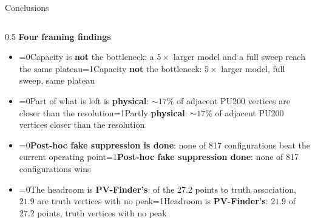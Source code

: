 \documentclass[xcolor=table,aspectratio=169]{beamer}
\providecommand{\talkbuild}{0}
\newcommand{\readingonly}[1]{\ifnum\talkbuild=0\relax#1\fi}
\newcommand{\talkonly}[1]{\ifnum\talkbuild=1\relax#1\fi}
\begin{document}
\begin{frame}{Conclusions}
\begin{columns}[t]
\begin{column}{0.5\linewidth}
            \textbf{Four framing findings}
            \begin{itemize}
                \setlength\itemsep{0.6em}
                \item \small \readingonly{Capacity is \textbf{not} the bottleneck: a $5\times$ larger
                    model and a full sweep reach the same plateau}\talkonly{Capacity \textbf{not} the
                    bottleneck: $5\times$ larger model, full sweep, same plateau}
                \item \small \readingonly{Part of what is left is \textbf{physical}: ${\sim}17\%$ of
                    adjacent PU200 vertices are closer than the resolution}\talkonly{Partly
                    \textbf{physical}: ${\sim}17\%$ of adjacent PU200 vertices closer than the resolution}
                \item \small \readingonly{\textbf{Post-hoc fake suppression is done}: none of 817
                    configurations beat the current operating point}\talkonly{\textbf{Post-hoc fake
                    suppression done}: none of 817 configurations wins}
                \item \small \readingonly{The headroom is \textbf{PV-Finder's}: of the $27.2$ points
                    to truth association, $21.9$ are truth vertices with no peak}\talkonly{Headroom is
                    \textbf{PV-Finder's}: $21.9$ of $27.2$ points, truth vertices with no peak}
            \end{itemize}
        \end{column}
    \end{columns}
\end{frame}
\end{document}
